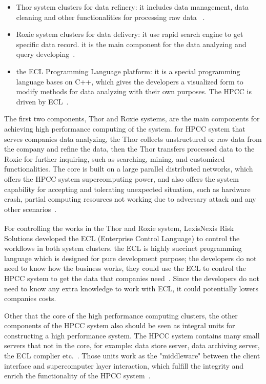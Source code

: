 \begin{itemize}
	\item Thor system clusters for data refinery: it includes data management, data cleaning and other functionalities for processing raw data ~\cite{Intro3}.
	\item Roxie system clusters for data delivery: it use rapid search engine to get specific data record. it is the main component for the data analyzing and query developing~\cite{HPCC}.
	\item the ECL Programming Language platform: it is a special programming language bases on C++, which gives the developers a visualized form to modify methods for data analyzing with their own purposes. The HPCC is driven by ECL~\cite{Intro2}.
\end{itemize}
The first two components, Thor and Roxie systems, are the main components for achieving high performance computing of the system. for HPCC system that serves companies data analyzing, the Thor collects unstructured or raw data from the company and refine the data, then the Thor transfers processed data to the Roxie for further inquiring, such as searching, mining, and customized functionalities. The core is built on a large parallel distributed networks, which offers the HPCC system supercomputing power, and also offers the system capability for accepting and tolerating unexpected situation, such as hardware crash, partial computing resources not working due to adversary attack and any other scenarios~\cite{Intro4}.

For controlling the works in the Thor and Roxie system, LexisNexis\textsuperscript{\textregistered} Risk Solutions developed the ECL (Enterprise Control Language) to control the workflows in both system clusters. the ECL is highly succinct programming language which is designed for pure development purpose; the developers do not need to know how the business works, they could use the ECL to control the HPCC system to get the data that companies need~\cite{ECL}. Since the developers do not need to know any extra knowledge to work with ECL, it could potentially lowers companies costs.

Other that the core of the high performance computing clusters, the other components of the HPCC system also should be seen as integral units for constructing a high performance system. The HPCC system contains many small servers that not in the core, for example: data store server, data archiving server, the ECL complier etc.~\cite{Intro4}. Those units work as the "middleware" between the client interface and supercomputer layer interaction, which fulfill the integrity and enrich the functionality of the HPCC system~\cite{Intro5}. 

